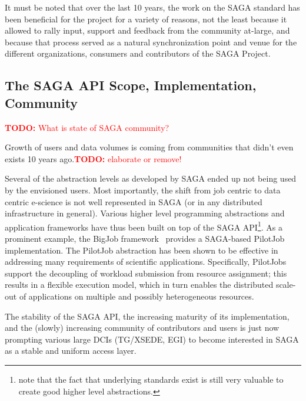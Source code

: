 \documentclass{article}
\newcommand{\B}[1]{\textbf{#1}}
\newcommand{\todo}[1]{{\textcolor{red}{\B{TODO:} #1 }}}
\newcommand{\todo}[1]{}
\begin{document}
  It must be noted that over the last 10 years, the work on the SAGA
  standard has been beneficial for the project for a variety of reasons,
  not the least because it allowed to rally input, support and feedback
  from the community at-large, and because that process served as
  a natural synchronization point and venue for the different
  organizations, consumers and contributors of the SAGA Project.


 \subsection{The SAGA API Scope, Implementation, Community}

  \todo{What is state of SAGA community?}

  Growth of users and data volumes is coming from communities that
  didn't even exists 10 years ago.\todo{elaborate or remove!}
 
  Several of the abstraction levels as developed by SAGA ended up not
  being used by the envisioned users.  Most importantly, the shift from
  job centric to data centric e-science is not well represented in SAGA
  (or in any distributed infrastructure in general).  Various higher
  level programming abstractions and application frameworks have thus
  been built on top of the SAGA API\footnote{note that the fact that
  underlying standards exist is still very valuable to create good
  higher level abstractions.}.  As a prominent example, the BigJob
  framework~\cite{saga_bigjob_condor_cloud}  provides a SAGA-based
  PilotJob implementation. The PilotJob abstraction has been shown to be
  effective in addressing many requirements of scientific applications.
  Specifically, PilotJobs support the decoupling of workload submission
  from resource assignment; this results in a flexible execution model,
  which in turn enables the distributed scale-out of applications on
  multiple and possibly heterogeneous resources. %

  The stability of the SAGA API, the increasing maturity of its
  implementation, and the (slowly) increasing community of contributors
  and users is just now prompting various large DCIs (TG/XSEDE, EGI) to
  become interested in SAGA as a stable and uniform access layer.  %
\end{document}
